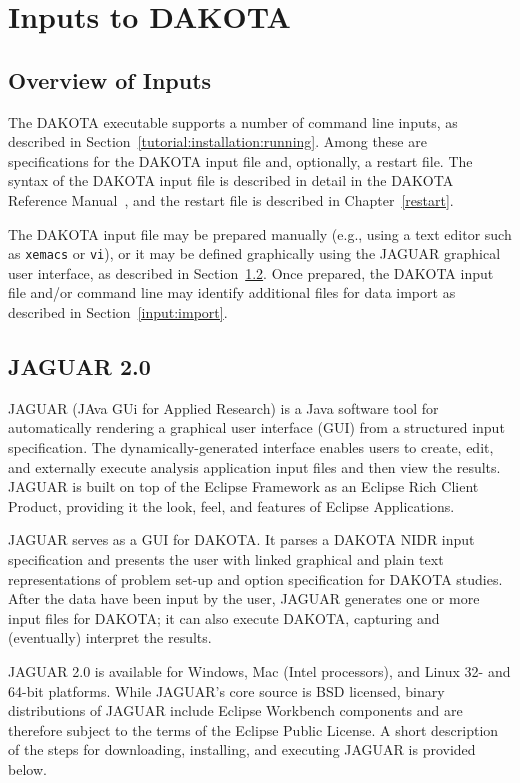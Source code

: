 \chapter{Inputs to DAKOTA}\label{input}

\section{Overview of Inputs}\label{input:overview}

The DAKOTA executable supports a number of command line inputs, as
described in Section~\ref{tutorial:installation:running}.  Among
these are specifications for the DAKOTA input file and, optionally, a
restart file.  The syntax of the DAKOTA input file is described in detail 
in the DAKOTA Reference Manual~\cite{RefMan}, and the restart file is
described in Chapter~\ref{restart}.

The DAKOTA input file may be prepared manually (e.g., using a text
editor such as \texttt{xemacs} or \texttt{vi}), or it may be defined
graphically using the JAGUAR graphical user interface, as described in
Section~\ref{input:gui}.  Once prepared, the DAKOTA input file and/or
command line may identify additional files for data import as
described in Section~\ref{input:import}.

\section{JAGUAR 2.0}\label{input:gui}

JAGUAR (JAva GUi for Applied Research) is a Java software tool for
automatically rendering a graphical user interface (GUI) from a
structured input specification.  The dynamically-generated interface
enables users to create, edit, and externally execute analysis
application input files and then view the results.  JAGUAR is built on
top of the Eclipse Framework \cite{Eclipse} as an Eclipse Rich
Client Product, providing it the look, feel, and features of Eclipse
Applications.

JAGUAR serves as a GUI for DAKOTA.  It parses a DAKOTA NIDR input
specification and presents the user with linked graphical and plain
text representations of problem set-up and option specification for
DAKOTA studies. After the data have been input by the user, JAGUAR
generates one or more input files for DAKOTA; it can also execute
DAKOTA, capturing and (eventually) interpret the results.

JAGUAR 2.0 is available for Windows, Mac (Intel processors), and Linux
32- and 64-bit platforms.  While JAGUAR's core source is BSD licensed,
binary distributions of JAGUAR include Eclipse Workbench components
and are therefore subject to the terms of the Eclipse Public License.
A short description of the steps for downloading, installing, and
executing JAGUAR is provided below.

